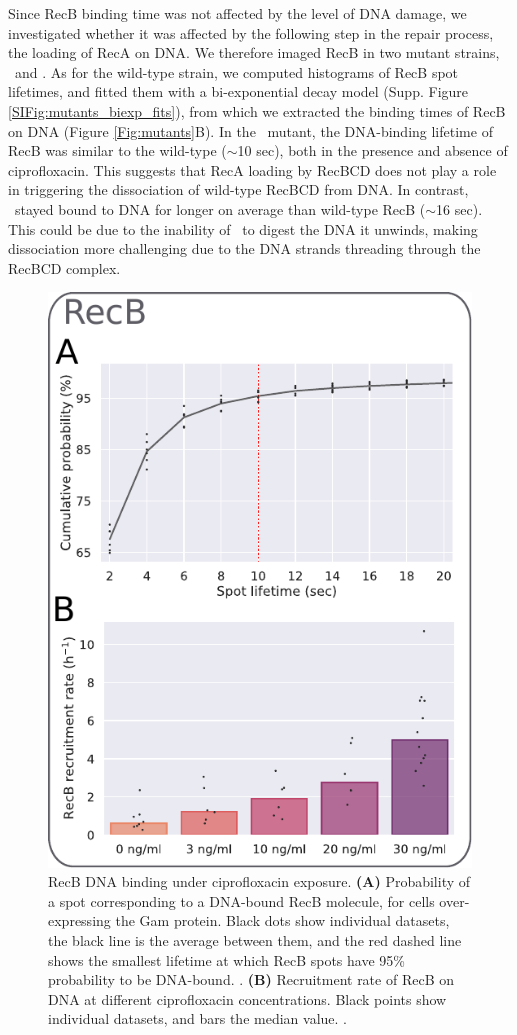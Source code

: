 Since RecB binding time was not affected by the level of DNA damage, we investigated whether it was affected by the following step in the repair process, the loading of RecA on DNA. We therefore imaged RecB in two mutant strains, \dreca\ and \geneteneighty. As for the wild-type strain, we computed histograms of RecB spot lifetimes, and fitted them with a bi-exponential decay model (Supp. Figure \ref{SIFig:mutants_biexp_fits}), from which we extracted the binding times of RecB on DNA (Figure \ref{Fig:mutants}B). In the \dreca\ mutant, the DNA-binding lifetime of RecB was similar to the wild-type ($\sim$10 sec), both in the presence and absence of ciprofloxacin. This suggests that RecA loading by RecBCD does not play a role in triggering the dissociation of wild-type RecBCD from DNA. In contrast, \teneighty\ stayed bound to DNA for longer on average than wild-type RecB ($\sim$16 sec). This could be due to the inability of \teneighty\ to digest the DNA it unwinds, making dissociation more challenging due to the DNA strands threading through the RecBCD complex.

\begin{figure}[htbp]
    \centering
    \includegraphics[width=.4\textwidth]{Figures/Fig2_RecB_recruitment.pdf}
    \caption{RecB DNA binding under ciprofloxacin exposure. \textbf{(A)} Probability of a spot corresponding to a DNA-bound RecB molecule, for cells over-expressing the Gam protein. Black dots show individual datasets, the black line is the average between them, and the red dashed line shows the smallest lifetime at which RecB spots have 95\% probability to be DNA-bound. .  \textbf{(B)} Recruitment rate of RecB on DNA at different ciprofloxacin concentrations. Black points show individual datasets, and bars the median value. . }
    \label{Fig:recruitment}
\end{figure}

